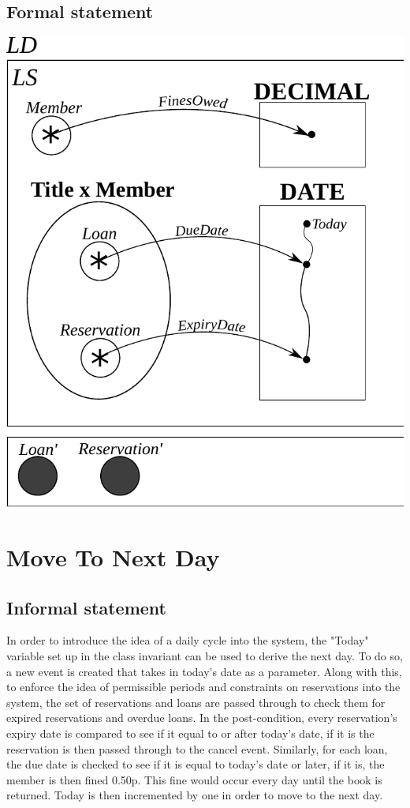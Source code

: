 \documentclass[]{report}
\begin{document}
\subsection{Formal statement}
\begin{center}
\includegraphics{class_invariant.pdf}
\end{center}
\newpage
\section{Move To Next Day}
\subsection{Informal statement}
In order to introduce the idea of a daily cycle into the system, the "Today" variable set up in the class invariant can be used to derive the next day. To do so, a new event is created that takes in today's date as a parameter. Along with this, to enforce the idea of permissible periods and constraints on reservations into the system, the set of reservations and loans are passed through to check them for expired reservations and overdue loans. In the post-condition, every reservation's expiry date is compared to see if it equal to or after today's date, if it is the reservation is then passed through to the cancel event. Similarly, for each loan, the due date is checked to see if it is equal to today's date or later, if it is, the member is then fined 0.50p. This fine would occur every day until the book is returned.  Today is then incremented by one in order to move to the next day. 
\end{document}

